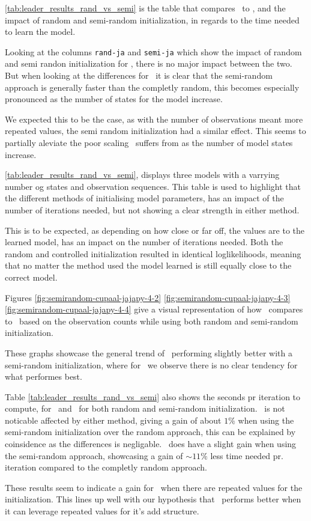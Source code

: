 \autoref{tab:leader_results_rand_vs_semi} is the table that compares \Cupaal\ to \Jajapy, and the impact of random and semi-random initialization, in regards to the time needed to learn the model.

Looking at the columns \texttt{rand-ja} and \texttt{semi-ja} which show the impact of random and semi randon initialization for \Jajapy, there is no major impact between the two.
But when looking at the differences for \Cupaal\ it is clear that the semi-random approach is generally faster than the completly random, this becomes especially pronounced as the number of states for the model increase.

We expected this to be the case, as with the number of observations meant more repeated values, the semi random initialization had a similar effect.
This seems to partially aleviate the poor scaling \Cupaal\ suffers from as the number of model states increase.

\autoref{tab:leader_results_rand_vs_semi}, displays three models with a varrying number og states and observation sequences.
This table is used to highlight that the different methods of initialising model parameters, has an impact of the number of iterations needed, but not showing a clear strength in either method.

This is to be expected, as depending on how close or far off, the values are to the learned model, has an impact on the number of iterations needed.
Both the random and controlled initialization resulted in identical loglikelihoods, meaning that no matter the method used the model learned is still equally close to the correct model.

Figures \autoref{fig:semirandom-cupaal-jajapy-4-2} \autoref{fig:semirandom-cupaal-jajapy-4-3} \autoref{fig:semirandom-cupaal-jajapy-4-4} give a visual representation of how \Cupaal\ compares to \Jajapy\ based on the observation counts while using both random and semi-random initialization.

These graphs showcase the general trend of \Cupaal\ performing slightly better with a semi-random initialization, where for \Jajapy\ we observe there is no clear tendency for what performes best.

Table \autoref{tab:leader_results_rand_vs_semi} also shows the seconds pr iteration to compute, for \Cupaal\ and \Jajapy\ for both random and semi-random initialization.
\Jajapy\ is not noticable affected by either method, giving a gain of about $1\%$ when using the semi-random initialization over the random approach, this can be explained by coinsidence as the differences is negligable.
\Cupaal\ does have a slight gain when using the semi-random approach, showcasing a gain of $\sim 11\%$ less time needed pr. iteration compared to the completly random approach.

These results seem to indicate a gain for \Cupaal\ when there are repeated values for the initialization.
This lines up well with our hypothesis that \Cupaal\ performs better when it can leverage repeated values for it's \gls{add} structure.
